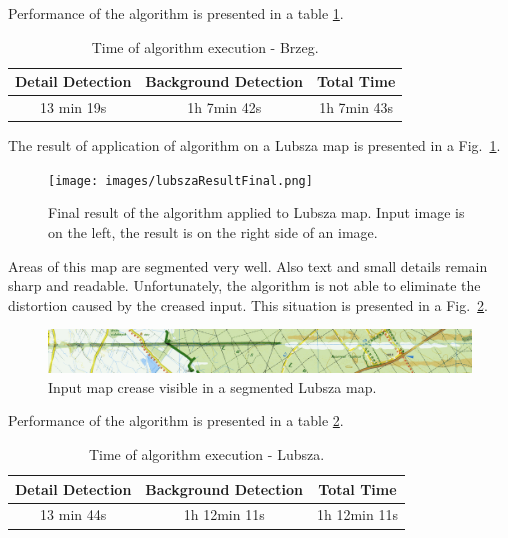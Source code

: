 \documentclass[a4paper,onecolumn,oneside,12pt]{memoir}
\begin{document}
Performance of the algorithm is presented in a table \ref{brzegPerformance}.

\begin{table}[!ht]
\begin{center}
\caption{Time of algorithm execution - Brzeg.}
\label{brzegPerformance}
\begin{tabular}{|c|c|c|}
  \hline
  Detail Detection & Background Detection & Total Time \\
  \hline
  13 min 19s & 1h 7min 42s & 1h 7min 43s \\
  \hline
\end{tabular}
\end{center}
\end{table}

The result of application of algorithm on a Lubsza map is presented in a Fig.~\ref{lubszaResult}.

\begin{figure}[!ht]
\begin{center}
\texttt{[image: images/lubszaResultFinal.png]}
\caption{Final result of the algorithm applied to Lubsza map. Input image is on the left, the result
is on the right side of an image.}
\label{lubszaResult}
\end{center}
\end{figure}

Areas of this map are segmented very well. Also text and small details remain sharp and readable.
Unfortunately, the algorithm is not able to eliminate the distortion caused by the creased input.
This situation is presented in a Fig.~\ref{lubszaCreased}.

\begin{figure}[!ht]
\begin{center}
\includegraphics[scale=0.13]{images/lubszaCreased.png}
\caption{Input map crease visible in a segmented Lubsza map.}
\label{lubszaCreased}
\end{center}
\end{figure}

Performance of the algorithm is presented in a table \ref{lubszaPerformance}.

\begin{table}[!ht]
\begin{center}
\caption{Time of algorithm execution - Lubsza.}
\label{lubszaPerformance}
\begin{tabular}{|c|c|c|}
  \hline
  Detail Detection & Background Detection & Total Time \\
  \hline
  13 min 44s & 1h 12min 11s & 1h 12min 11s \\
  \hline
\end{tabular}
\end{center}
\end{table}
\end{document}
